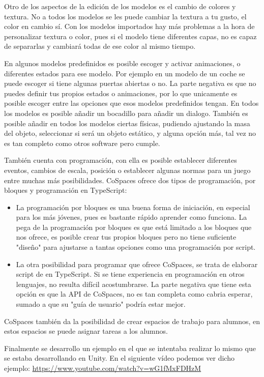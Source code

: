Otro de los aspectos de la edición de los modelos es el cambio de colores y textura. No a todos los modelos se les puede cambiar la textura a tu gusto, el color en cambio sí. Con los modelos importados hay más problemas a la hora de personalizar textura o color, pues si el modelo tiene diferentes capas, no es capaz de separarlas y cambiará todas de ese color al mismo tiempo. 

En algunos modelos predefinidos es posible escoger y activar animaciones, o diferentes estados para ese modelo. Por ejemplo en un modelo de un coche se puede escoger si tiene algunas puertas abiertas o no. La parte negativa es que no puedes definir tus propios estados o animaciones, por lo que unicamente es posible escoger entre las opciones que esos modelos predefinidos tengan. En todos los modelos es posible añadir un bocadillo para añadir un dialogo. También es posible añadir en todos los modelos ciertas físicas, pudiendo ajustando la masa del objeto, seleccionar si será un objeto estático, y alguna opción más, tal vez no es tan completo como otros software pero cumple.

También cuenta con programación, con ella es posible establecer diferentes eventos, cambios de escala, posición o establecer algunas normas para un juego entre muchas más posibilidades. CoSpaces ofrece dos tipos de programación, por bloques y programación en TypeScript:
\begin{itemize}
	\item La programación por bloques es una buena forma de iniciación, en especial para los más jóvenes, pues es bastante rápido aprender como funciona. La pega de la programación por bloques es que está limitado a los bloques que nos ofrece, es posible crear tus propios bloques pero no tiene suficiente "diseño" para ajustarse a tantas opciones como una programación por script. 
	\item La otra posibilidad para programar que ofrece CoSpaces, se trata de elaborar script de en TypeScript. Si se tiene experiencia en programación en otros lenguajes, no resulta difícil acostumbrarse. La parte negativa que tiene esta opción es que la API de CoSpaces, no es tan completa como cabria esperar, sumado a que su "guía de usuario" podría estar mejor.
\end{itemize}
 

CoSpaces también da la posibilidad de crear espacios de trabajo para alumnos, en estos espacios se puede asignar tareas a los alumnos.

Finalmente se desarrollo un ejemplo en el que se intentaba realizar lo mismo que se estaba desarrollando en Unity. En el siguiente vídeo podemos ver dicho ejemplo: \url{https://www.youtube.com/watch?v=wG1fMxFDHzM}

